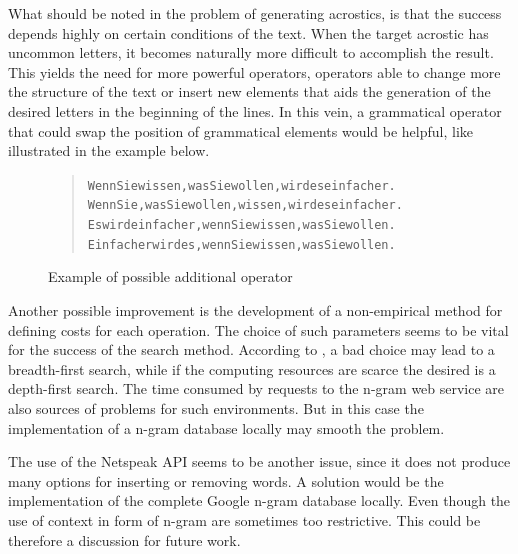 \documentclass[11pt]{reportAlternative}
\begin{document}
What should be noted in the problem of generating acrostics, is that the success depends highly on certain conditions of the text. When the target acrostic has uncommon letters, it becomes naturally more difficult to accomplish the result. This yields the need for more powerful operators, operators able to change more the structure of the text or insert new elements that aids the generation of the desired letters in the beginning of the lines. In this vein, a grammatical operator that could swap the position of grammatical elements would be helpful, like illustrated in the example below. \par

\begin{figure}[H]
\begin{quote}
\begin{alltt}
Wenn Sie wissen, was Sie wollen, wird es einfacher.
Wenn Sie, was Sie wollen, wissen, wird es einfacher.
Es wird einfacher, wenn Sie wissen, was Sie wollen.
Einfacher wird es, wenn Sie wissen, was Sie wollen.
\end{alltt}
\end{quote}
\caption{Example of possible additional operator}
\end{figure}

Another possible improvement is the development of a non-empirical method for defining costs for each operation. The choice of such parameters seems to be vital for the success of the search method. According to \cite[p.~2023]{Stein}, a bad choice may lead to a breadth-first search, while if the computing resources are scarce the desired is a depth-first search. The time consumed by requests to the n-gram web service are also sources of problems for such environments. But in this case the implementation of a n-gram database locally may smooth the problem. \par

The use of the Netspeak API seems to be another issue, since it does not produce many options for inserting or removing words. A solution would be the implementation of the complete Google n-gram database locally. Even though the use of context in form of n-gram are sometimes too restrictive. This could be therefore a discussion for future work.
\end{document}
